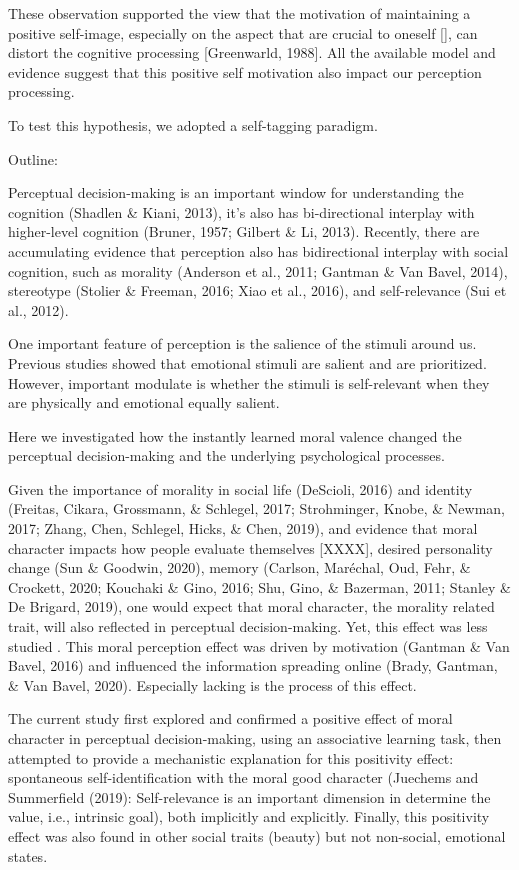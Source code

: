\documentclass[
  english,
  man]{apa6}
\begin{document}
These observation supported the view that the motivation of maintaining a positive self-image, especially on the aspect that are crucial to oneself {[}{]}, can distort the cognitive processing {[}Greenwarld, 1988{]}. All the available model and evidence suggest that this positive self motivation also impact our perception processing.

To test this hypothesis, we adopted a self-tagging paradigm.

Outline:

Perceptual decision-making is an important window for understanding the cognition (Shadlen \& Kiani, 2013), it's also has bi-directional interplay with higher-level cognition (Bruner, 1957; Gilbert \& Li, 2013). Recently, there are accumulating evidence that perception also has bidirectional interplay with social cognition, such as morality (Anderson et al., 2011; Gantman \& Van Bavel, 2014), stereotype (Stolier \& Freeman, 2016; Xiao et al., 2016), and self-relevance (Sui et al., 2012).

One important feature of perception is the salience of the stimuli around us. Previous studies showed that emotional stimuli are salient and are prioritized. However, important modulate is whether the stimuli is self-relevant when they are physically and emotional equally salient.

Here we investigated how the instantly learned moral valence changed the perceptual decision-making and the underlying psychological processes.

Given the importance of morality in social life (DeScioli, 2016) and identity (Freitas, Cikara, Grossmann, \& Schlegel, 2017; Strohminger, Knobe, \& Newman, 2017; Zhang, Chen, Schlegel, Hicks, \& Chen, 2019), and evidence that moral character impacts how people evaluate themselves {[}XXXX{]}, desired personality change (Sun \& Goodwin, 2020), memory (Carlson, Maréchal, Oud, Fehr, \& Crockett, 2020; Kouchaki \& Gino, 2016; Shu, Gino, \& Bazerman, 2011; Stanley \& De Brigard, 2019), one would expect that moral character, the morality related trait, will also reflected in perceptual decision-making. Yet, this effect was less studied . This moral perception effect was driven by motivation (Gantman \& Van Bavel, 2016) and influenced the information spreading online (Brady, Gantman, \& Van Bavel, 2020). Especially lacking is the process of this effect.

The current study first explored and confirmed a positive effect of moral character in perceptual decision-making, using an associative learning task, then attempted to provide a mechanistic explanation for this positivity effect: spontaneous self-identification with the moral good character (Juechems and Summerfield (2019): Self-relevance is an important dimension in determine the value, i.e., intrinsic goal), both implicitly and explicitly. Finally, this positivity effect was also found in other social traits (beauty) but not non-social, emotional states.
\end{document}
